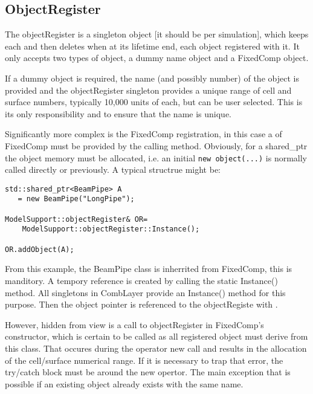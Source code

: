 \subsection{ObjectRegister}
\label{ObjectRegister}

The objectRegister is a singleton object [it should be per
  simulation], which keeps each and then deletes when at its lifetime
end, each object registered with it. It only accepts two types of
object, a dummy name object and a FixedComp object. 

If a dummy object is required, the name (and possibly number) of the object 
is provided and the objectRegister singleton provides a unique
range of cell and surface numbers, typically 10,000 units of each, but
can be user selected. This is its only responsibility and to ensure that the
name is unique. 

Significantly more complex is the FixedComp registration, in this case
a  of FixedComp must be provided by the
calling method. Obviously, for a shared\_ptr the object memory must be
allocated, i.e. an initial \verb|new object(...)| is normally called
directly or previously. A typical structrue might be:

\begin{verbatim}
std::shared_ptr<BeamPipe> A 
   = new BeamPipe("LongPipe");

ModelSupport::objectRegister& OR=
    ModelSupport::objectRegister::Instance();

OR.addObject(A);
\end{verbatim}

From this example, the BeamPipe class is inherrited from FixedComp,
this is manditory. A tempory reference  is created by calling
the static Instance() method. All singletons in CombLayer provide an
Instance() method for this purpose. Then the object pointer is referenced
to the objectRegiste with .

However, hidden from view is a call to objectRegister in FixedComp's
constructor, which is certain to be called as all registered object must derive
from this class. That occures during the operator new call and results
in the allocation of the cell/surface numerical range. If it is
necessary to trap that error, the try/catch block must be around the
new opertor. The main exception that is possible if an existing object
already exists with the same name.


